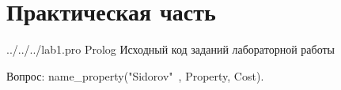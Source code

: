 \chapter*{Практическая часть}

	{../../../lab1.pro} %
	{Prolog} %
	{Исходный код заданий лабораторной работы} %

Вопрос: name\_property("Sidorov"\ , Property, Cost).


